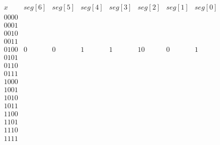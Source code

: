 \begin{enumerate}
$$\begin{array}{l|l|l|l|l|l|l|l}
x 	   & seg[6] & seg[5] & seg[4] & seg[3] & seg[2] & seg[1] & seg[0]  \\ \hline
0000 &           &             &            &           &            &            &   \\ \hline
0001 &           &             &            &           &            &            &   \\ \hline
0010 &           &             &            &           &            &            &   \\ \hline
0011 &           &             &            &           &            &            &   \\ \hline
0100 &   0        &    0       &     1     &     1    &     10    &      0     &  1  \\ \hline
0101 &           &             &            &           &            &            &   \\ \hline
0110 &           &             &            &           &            &            &   \\ \hline
0111 &           &             &            &           &            &            &   \\ \hline
1000 &           &             &            &           &            &            &   \\ \hline
1001 &           &             &            &           &            &            &   \\ \hline
1010 &           &             &            &           &            &            &   \\ \hline
1011 &           &             &            &           &            &            &   \\ \hline
1100 &           &             &            &           &            &            &   \\ \hline
1101 &           &             &            &           &            &            &   \\ \hline
1110 &           &             &            &           &            &            &   \\ \hline
1111 &           &             &            &           &            &            &   \\ 
\end{array}$$


















\end{enumerate}
